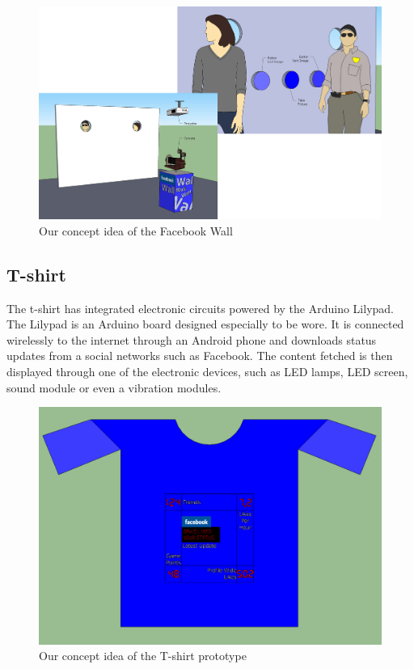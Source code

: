 \begin{figure}[h!]
\centering \includegraphics[scale=0.22]{img/prestudies-facebookwall} \caption{Our concept idea of the Facebook Wall}

\label{fig:prestudies-facebookwall}
\end{figure}

\newpage

\subsection{T-shirt}
The t-shirt has integrated electronic circuits powered by the Arduino Lilypad.
The Lilypad is an Arduino board designed especially to be wore.
It is connected wirelessly to the internet through an Android phone and downloads status updates from a social
networks such as Facebook. The content fetched is then displayed through one of the electronic devices, such as LED lamps,
LED screen, sound module or even a vibration modules.

\begin{figure}[h!]
\centering \includegraphics[scale=0.35]{img/prestudies-tshirt} \caption{Our concept idea of the T-shirt prototype}

\label{fig:prestudies-tshirt}
\end{figure}

